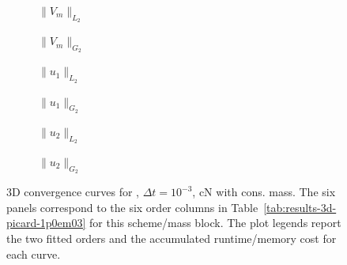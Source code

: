 \begin{figure}[p]
\centering
\begin{subfigure}{0.485\linewidth}
\centering
{}
\caption{$\|V_m\|_{L_2}$}
\label{fig:results-3d-picard-1p0em03-cranknicolson-consistent-a}
\end{subfigure}
\hfill
\begin{subfigure}{0.485\linewidth}
\centering
{}
\caption{$\|V_m\|_{G_2}$}
\label{fig:results-3d-picard-1p0em03-cranknicolson-consistent-b}
\end{subfigure}
\par\vspace{0.8em}
\begin{subfigure}{0.485\linewidth}
\centering
{}
\caption{$\|u_1\|_{L_2}$}
\label{fig:results-3d-picard-1p0em03-cranknicolson-consistent-c}
\end{subfigure}
\hfill
\begin{subfigure}{0.485\linewidth}
\centering
{}
\caption{$\|u_1\|_{G_2}$}
\label{fig:results-3d-picard-1p0em03-cranknicolson-consistent-d}
\end{subfigure}
\par\vspace{0.8em}
\begin{subfigure}{0.485\linewidth}
\centering
{}
\caption{$\|u_2\|_{L_2}$}
\label{fig:results-3d-picard-1p0em03-cranknicolson-consistent-e}
\end{subfigure}
\hfill
\begin{subfigure}{0.485\linewidth}
\centering
{}
\caption{$\|u_2\|_{G_2}$}
\label{fig:results-3d-picard-1p0em03-cranknicolson-consistent-f}
\end{subfigure}
\caption{3D convergence curves for , $\Delta t=10^{-3}$, cN with cons. mass. The six panels correspond to the six order columns in Table~\ref{tab:results-3d-picard-1p0em03} for this scheme/mass block. The plot legends report the two fitted orders and the accumulated runtime/memory cost for each curve.}
\label{fig:results-3d-picard-1p0em03-cranknicolson-consistent}
\end{figure}
\FloatBarrier

